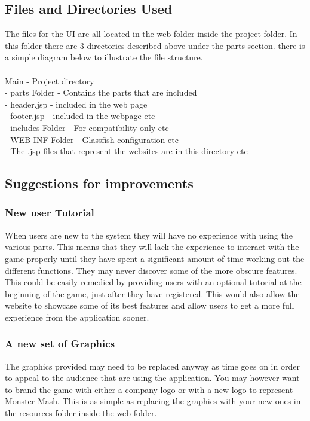 \documentclass[titlepage]{article}
\begin{document}
{\subsection {Files and Directories Used}
The files for the UI are all located in the web folder inside the project folder. In this folder there are 3 directories described above under the parts section. there is a simple diagram below to illustrate the file structure.
\\
\\
Main - Project directory\\
  - parts Folder - Contains the parts that are included\\
         - header.jsp - included in the web page\\
         - footer.jsp - included in the webpage etc\\
  - includes Folder - For compatibility only etc\\
  - WEB-INF Folder - Glassfish configuration etc\\
  - The .jsp files that represent the websites are in this directory etc
\subsection {Suggestions for improvements}
\subsubsection {New user Tutorial}
When users are new to the system they will have no experience with using the various parts. This means that they will lack the experience to interact with the game properly until they have spent a significant amount of time working out the different functions. They may never discover some of the more obscure features.
\\
This could be easily remedied by providing users with an optional tutorial at the beginning of the game, just after they have registered. This would also allow the website to showcase some of its best features and allow users to get a more full experience from the application sooner.
\subsubsection {A new set of Graphics}
The graphics provided may need to be replaced anyway as time goes on in order to appeal to the audience that are using the application. You may however want to brand the game with either a company logo or with a new logo to represent Monster Mash. This is as simple as replacing the graphics with your new ones in the resources folder inside the web folder.
}
\end{document}
